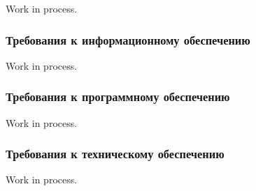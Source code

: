 Work in process.

\subsubsection{Требования к информационному обеспечению}

Work in process.

\subsubsection{Требования к программному обеспечению}

Work in process.

\subsubsection{Требования к техническому обеспечению}

Work in process.

\clearpage
\newpage